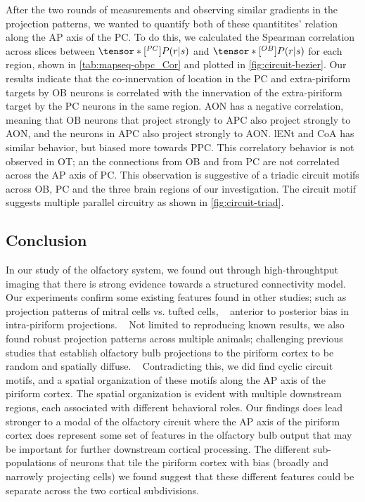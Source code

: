 \documentclass[../dissertation.tex]{subfiles}
\begin{document}

After the two rounds of measurements and observing similar gradients in the projection patterns, we wanted to quantify both of these quantitites' relation along the AP axis of the PC.
To do this, we calculated the Spearman correlation across slices between $\tensor*[^{PC}]{P}{} (r | s)$ and $ \tensor*[^{OB}]{P}{} (r | s)$ for each region, shown in \cref{tab:mapseq-obpc_Cor} and plotted in \cref{fig:circuit-bezier}.
Our results indicate that the co-innervation of location in the PC and extra-piriform targets by OB neurons is correlated with the innervation of the extra-piriform target by the PC neurons in the same region.
AON has a negative correlation, meaning that OB neurons that project strongly to APC also project strongly to AON, and the neurons in APC also project strongly to AON.
lENt and CoA has similar behavior, but biased more towards PPC.
This correlatory behavior is not observed in OT; an the connections from OB and from PC are not correlated across the AP axis of PC.
This observation is suggestive of a triadic circuit motifs across OB, PC and the three brain regions of our investigation.
The circuit motif suggests multiple parallel circuitry as shown in \cref{fig:circuit-triad}. 

\subsection{Conclusion}

In our study of the olfactory system, we found out through high-throughtput imaging that there is strong evidence towards a structured connectivity model.
Our experiments confirm some existing features found in other studies; such as projection patterns of mitral cells vs. tufted cells,
~\cite{mapseq016,mapseq017,mapseq019,mapseq020,mapseq021,mapseq090}
anterior to posterior bias in intra-piriform projections.
~\cite{mapseq086,mapseq091,mapseq092}
Not limited to reproducing known results, we also found robust projection patterns across multiple animals; challenging previous studies that establish olfactory bulb projections to the piriform cortex to be random and spatially diffuse.
~\cite{mapseq016,mapseq017,mapseq019,mapseq020,mapseq022,mapseq023,mapseq024}
Contradicting this, we did find cyclic circuit motifs, and a spatial organization of these motifs along the AP axis of the piriform cortex.
The spatial organization is evident with multiple downstream regions, each associated with different behavioral roles.
Our findings does lead stronger to a modal of the olfactory circuit where the AP axis of the piriform cortex does represent some set of features in the olfactory bulb output that may be important for further downstream cortical processing.
The different sub-populations of neurons that tile the piriform cortex with bias (broadly and narrowly projecting cells) we found suggest that these different features could be separate across the two cortical subdivisions.
\end{document}
